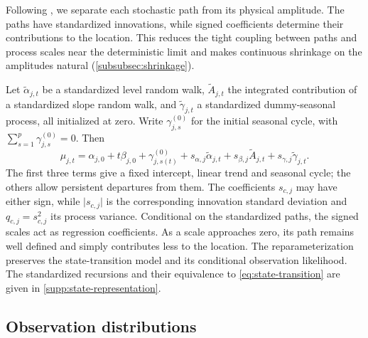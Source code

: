 \documentclass[11pt,a4paper]{article}
\begin{document}
	Following \citet{fruhwirthschnatter2010}, we separate each stochastic path from its physical amplitude. The paths have standardized innovations, while signed coefficients determine their contributions to the location. This reduces the tight coupling between paths and process scales near the deterministic limit and makes continuous shrinkage on the amplitudes natural (\cref{subsubsec:shrinkage}).
	
	Let \(\widetilde\alpha_{j,t}\) be a standardized level random walk, \(\widetilde A_{j,t}\) the integrated contribution of a standardized slope random walk, and \(\widetilde\gamma_{j,t}\) a standardized dummy-seasonal process, all initialized at zero. Write \(\gamma^{(0)}_{j,s}\) for the initial seasonal cycle, with \(\sum_{s=1}^{p}\gamma^{(0)}_{j,s}=0\). Then
	\begin{equation}\label{eq:fs}
		\mu_{j,t}
		=\alpha_{j,0}+t\beta_{j,0}+\gamma^{(0)}_{j,s(t)}
		+s_{\alpha,j}\widetilde\alpha_{j,t}
		+s_{\beta,j}\widetilde A_{j,t}
		+s_{\gamma,j}\widetilde\gamma_{j,t}.
	\end{equation}
	The first three terms give a fixed intercept, linear trend and seasonal cycle; the others allow persistent departures from them. The coefficients \(s_{c,j}\) may have either sign, while \(\lvert s_{c,j}\rvert\) is the corresponding innovation standard deviation and \(q_{c,j}=s_{c,j}^2\) its process variance. Conditional on the standardized paths, the signed scales act as regression coefficients. As a scale approaches zero, its path remains well defined and simply contributes less to the location. The reparameterization preserves the state-transition model and its conditional observation likelihood. The standardized recursions and their equivalence to \cref{eq:state-transition} are given in \cref{supp:state-representation}.
	
	\subsection{Observation distributions}
	\label{subsec::observation_distributions}
	
\end{document}
